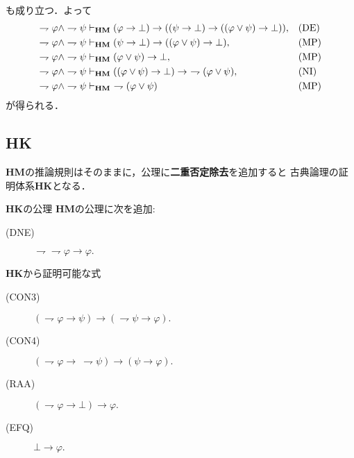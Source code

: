 \begin{sketch}[DM$\vee$]
\begin{align}
		\end{align}
		も成り立つ．よって
		\begin{align}
			\rightharpoondown \varphi \wedge \rightharpoondown \psi &\provable{\mbox{{\bf HM}}} 
				(\varphi \rightarrow \bot) \rightarrow ((\psi \rightarrow \bot) 
				\rightarrow ((\varphi \vee \psi) \rightarrow \bot)), && \mbox{(DE)}\\
			\rightharpoondown \varphi \wedge \rightharpoondown \psi &\provable{\mbox{{\bf HM}}} 
				(\psi \rightarrow \bot) \rightarrow ((\varphi \vee \psi) \rightarrow \bot), && \mbox{(MP)}\\
			\rightharpoondown \varphi \wedge \rightharpoondown \psi &\provable{\mbox{{\bf HM}}} 
				(\varphi \vee \psi) \rightarrow \bot, && \mbox{(MP)}\\
			\rightharpoondown \varphi \wedge \rightharpoondown \psi &\provable{\mbox{{\bf HM}}} 
				((\varphi \vee \psi) \rightarrow \bot) \rightarrow\ \rightharpoondown (\varphi \vee \psi), && \mbox{(NI)}\\
			\rightharpoondown \varphi \wedge \rightharpoondown \psi &\provable{\mbox{{\bf HM}}} 
				\ \rightharpoondown (\varphi \vee \psi) && \mbox{(MP)}
		\end{align}
		が得られる．
		\QED
	\end{sketch}
	
\subsection{{\bf HK}}
	{\bf HM}の推論規則はそのままに，公理に{\bf 二重否定除去}を追加すると
	古典論理の証明体系{\bf HK}となる．
	
	\begin{itembox}[l]{{\bf HK}の公理}
		{\bf HM}の公理に次を追加:
		\begin{description}
			\item[(DNE)] $\rightharpoondown \rightharpoondown \varphi \rightarrow \varphi.$
		\end{description}
	\end{itembox}
	
	{\bf HK}から証明可能な式
	\begin{description}
		\item[(CON3)] $(\rightharpoondown \varphi \rightarrow \psi) \rightarrow (\rightharpoondown \psi \rightarrow \varphi).$
		\item[(CON4)] $(\rightharpoondown \varphi \rightarrow\ \rightharpoondown \psi) 
			\rightarrow (\psi \rightarrow \varphi).$
		\item[(RAA)] $(\rightharpoondown \varphi \rightarrow \bot) \rightarrow \varphi.$
		\item[(EFQ)] $\bot \rightarrow \varphi.$
	\end{description}
	
